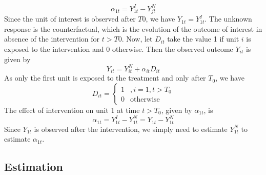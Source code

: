 \documentclass[12pt,nobind, a4paper]{reedthesis}
\begin{document}
 \[\alpha_{1t}= Y^{I}_{1t}-Y^{N}_{jt}\]
 Since the unit of interest is observed after \(T0\), we have \(Y_{1t}=Y^{I}_{1t}\). The unknown response is the counterfactual, which is the evolution of the outcome of interest in absence of the intervention for \(t>T0\). Now, let \(D_{it}\) take the value 1 if unit \(i\) is exposed to the intervention and 0 otherwise. Then the observed outcome \(Y_{it}\) is given by
 \begin{equation}
 Y_{it}= Y^{N}_{it} + \alpha_{it} D_{it}
 \label{eq:eq1}
 \end{equation}
 As only the first unit is exposed to the treatment and only after \(T_0\), we have
 \begin{equation}
 D_{it} = 
 \begin{cases} 
 1 & , i=1, t>T_0 \\
  0 &\text{otherwise}
 \end{cases}
 \label{eq:eq2}
 \end{equation}
 The effect of intervention on unit 1 at time \(t>T_0\), given by \(\alpha_{1t}\), is
 \begin{equation}
 \alpha_{1t}= Y^{I}_{1t}-Y^{N}_{1t}= Y_{1t}-Y^{N}_{1t}
 \label{eq:eq3}
 \end{equation}
 Since \(Y_{1t}\) is observed after the intervention, we simply need to estimate \(Y^{N}_{1t}\) to estimate \(\alpha_{1t}\).

 \hypertarget{estimation}{%
 \subsection{Estimation}\label{estimation}}
\end{document}
